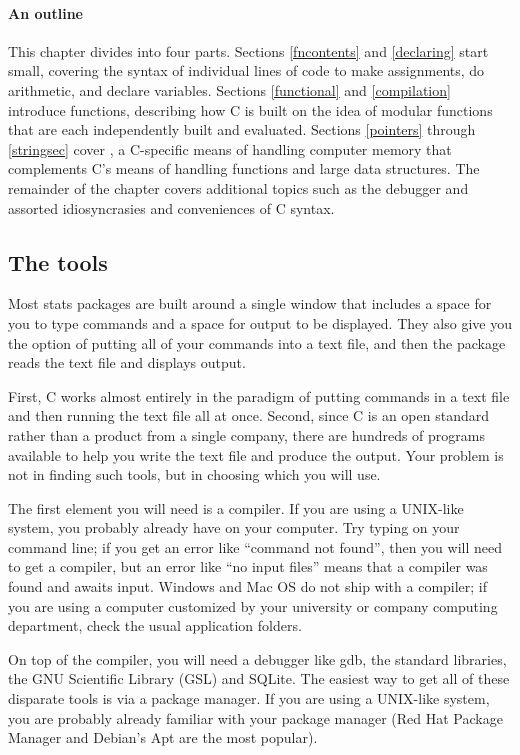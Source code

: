 \documentclass[12pt]{article}
\makeatletter
\def\cind#1{\index{#1@\cinline{#1}}\cinline{#1}}
\makeatother
\begin{document}
\paragraph{An outline} 

This chapter divides into four parts.
Sections \ref{fncontents} and  \ref{declaring} start small, covering the syntax of individual lines of code to make assignments, do arithmetic, and declare variables.
Sections \ref{functional} and \ref{compilation} introduce functions,
describing how C is built on the idea of modular functions that are
each independently built and evaluated.  Sections \ref{pointers}
through \ref{stringsec} cover
, a C-specific means of handling computer memory that
complements C's means of handling functions and large data structures. The
remainder of the chapter covers additional topics such as the debugger
and assorted idiosyncrasies and conveniences of C syntax.

\subsection{The tools} 
Most stats packages are built around a single window that includes a
space for you to type commands and a space for output to be displayed.
They also give you the option of putting all of your commands into a
text file, and then the package reads the text file and displays output.

First, C works almost entirely in the paradigm of putting commands in a
text file and then running the text file all at once. Second, since
C is an open standard rather than a product from a single company, there
are hundreds of programs available to help you write the text file and
produce the output. Your problem is not in finding such tools, but in
choosing which you will use.

The first element you will need is a compiler. If you are using
a UNIX-like system, you probably already have \cind{gcc} on your
computer. Try typing  on your command line; if you get an
error like ``command not found'', then you will need to get a compiler,
but an error like ``no input files'' means that a compiler was found
and awaits input. Windows and Mac OS do not ship with a compiler; if you
are using a computer customized by your university or company computing
department, check the usual application folders.

On top of the compiler, you will need a debugger like gdb, the standard
libraries, the GNU Scientific Library (GSL) and SQLite.  The easiest
way to get all of these disparate tools is via a package manager. If
you are using a UNIX-like system, you are probably already familiar with
your package manager (Red Hat Package Manager and Debian's Apt are the
most popular).
\end{document}
